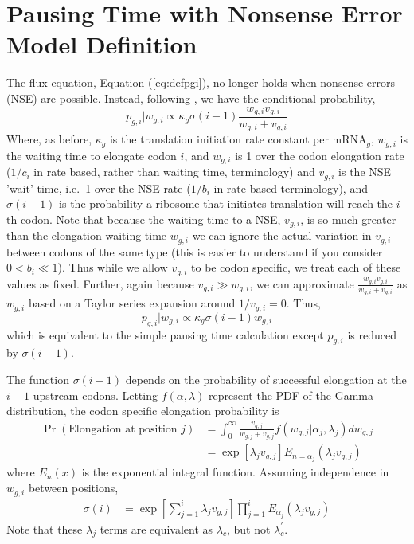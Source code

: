 \documentclass{article}
\newcommand{\waitTerm}{\ensuremath{w}\xspace}
\newcommand{\wgi}{\ensuremath{\waitTerm_{g,i}}\xspace}
\newcommand{\wgj}{\ensuremath{\waitTerm_{g,j}}\xspace}
\newcommand{\alphaj}{\ensuremath{{\alpha_j}}\xspace}
\newcommand{\lambdac}{\ensuremath{{\lambda_c}}\xspace}
\newcommand{\lambdacprime}{\ensuremath{{\lambda_c^\prime}}\xspace}
\newcommand{\lambdaj}{\ensuremath{{\lambda_j}}\xspace}
\newcommand{\nseTerm}{\ensuremath{v}\xspace}
\newcommand{\vgi}{\ensuremath{\nseTerm_{g,i}}\xspace}
\newcommand{\vgj}{\ensuremath{\nseTerm_{g,j}}\xspace}
\newcommand{\pgi}{\ensuremath{{p_{g,i}}}\xspace}
\newcommand{\kappag}{\ensuremath{{\kappa_{g}}}\xspace}
\newcommand{\mRNAg}{mRNA$_g$\xspace}
\begin{document}
\section*{Pausing Time with Nonsense Error Model Definition}
The flux equation, Equation (\ref{eq:defpgi}), no longer holds when nonsense errors (NSE) are possible.
Instead, following \citet{GilchristAndWagner06}, we have the conditional probability,
\begin{equation}
\label{eq:defpgiNse}
\pgi|\wgi \propto \kappag \sigma(i-1) \frac{\wgi \vgi}{\wgi + \vgi}
\end{equation} 
Where, as before, \kappag is the translation initiation rate constant per \mRNAg, \wgi is the waiting time to elongate codon $i$, and  \wgi is 1 over the codon elongation rate ($1/c_i$ in rate based, rather than waiting time, terminology) and \vgi is the NSE 'wait' time, i.e.~1 over the NSE rate ($1/b_i$ in rate based terminology), and $\sigma(i-1)$ is the probability a ribosome that initiates translation will reach the $i$th codon.
Note that because the waiting time to a NSE, \vgi, is so much greater than the elongation waiting time \wgi we can ignore the actual variation in \vgi between codons of the same type (this is easier to understand if you consider $0 < b_i \ll 1$).
Thus while we allow \vgi to be codon specific, we treat each of these values as fixed.
Further, again because $\vgi \gg \wgi$, we can approximate $\frac{\wgi \vgi}{\wgi + \vgi}$ as $\wgi$ based on a Taylor series expansion around $1/\vgi = 0 $.
Thus,
\begin{equation}
\label{eq:defpgiNseApprox}
\pgi|\wgi \propto \kappag \sigma(i-1) \wgi
\end{equation} 
which is equivalent to the simple pausing time calculation except $\pgi$ is reduced by $\sigma(i-1)$.


The function $\sigma(i-1)$ depends on the probability of successful elongation at the $i-1$ upstream codons.
Letting $f(\alpha, \lambda)$ represent the PDF of the Gamma distribution, the codon specific elongation probability is
\begin{align}
\label{eq:defElongPr}
\Pr(\text{Elongation at position $j$}) &= \int_0^\infty \frac{\vgj}{\wgj + \vgj} f\left(\wgj | \alphaj, \lambdaj\right) d\wgj\\
 &= \exp\left[\lambdaj \vgj\right] E_{n = \alphaj}\left(\lambdaj \vgj\right)
\end{align}
where $E_n(x)$ is the exponential integral function.
Assuming independence in \wgi between positions, 
  \label{eq:defSigma}
\begin{align}
  \sigma(i) &=  \exp\left[\sum_{j=1}^i \lambdaj \vgj\right]  \prod_{j=1}^{i} E_{\alphaj}\left(\lambdaj \vgj\right)
\end{align}
Note that these \lambdaj terms are equivalent as \lambdac, but not \lambdacprime.
\end{document}
